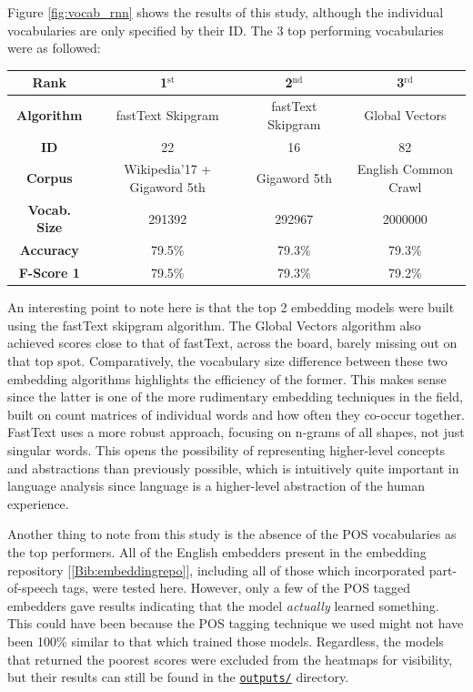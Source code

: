 Figure \ref{fig:vocab_rnn} shows the results of this study, although the individual vocabularies are only specified by their ID. The 3 top performing vocabularies were as followed:
\begin{center}
    \begin{tabular}{c|c|c|c}
        \textbf{Rank}   & \textbf{1$^\text{st}$} & \textbf{ 2$^\text{nd}$} & \textbf{3$^\text{rd}$} \\
        \hline
        \textbf{Algorithm} & fastText Skipgram & fastText Skipgram & Global Vectors \\
        \hline
        \textbf{ID}     & 22  & 16  & 82 \\ 
        \hline
        \textbf{Corpus} & Wikipedia'17 + Gigaword 5th & Gigaword 5th  &  English Common Crawl  \\
        \hline
        \textbf{Vocab. Size} & 291392 & 292967 & 2000000  \\
        \hline
        \hline
        \textbf{Accuracy} & 79.5\% & 79.3\% & 79.3\%    \\
        \hline
        \textbf{F-Score 1} & 79.5\% & 79.3\% & 79.2\%    \\
    \end{tabular}
\end{center}

An interesting point to note here is that the top 2 embedding models were built using the fastText skipgram algorithm. The Global Vectors algorithm also achieved scores close to that of fastText, across the board, barely missing out on that top spot. Comparatively, the vocabulary size difference between these two embedding algorithms highlights the efficiency of the former. This makes sense since the latter is one of the more rudimentary embedding techniques in the field, built on count matrices of individual words and how often they co-occur together. FastText uses a more robust approach, focusing on n-grams of all shapes, not just singular words. This opens the possibility of representing higher-level concepts and abstractions than previously possible, which is intuitively quite important in language analysis since language is a higher-level abstraction of the human experience.

Another thing to note from this study is the absence of the POS vocabularies as the top performers. All of the English embedders present in the embedding repository [\ref{Bib:embeddingrepo}], including all of those which incorporated part-of-speech tags, were tested here. However, only a few of the POS tagged embedders gave results indicating that the model \textit{actually} learned something. This could have been because the POS tagging technique we used might not have been 100\% similar to that which trained those models. Regardless, the models that returned the poorest scores were excluded from the heatmaps for visibility, but their results can still be found in the \href{https://github.uio.no/fabior/IN5550/tree/master/Oblig2/outputs/}{\texttt{outputs/}} directory. 

